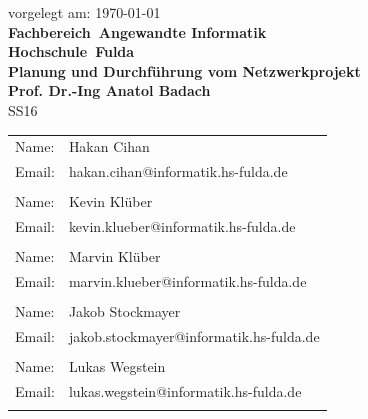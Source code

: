 \documentclass[a4paper,11pt]{article}
\begin{document}
\begin{titlepage}
\begin{center}
    \normalsize
    vorgelegt am: \today \\
    \vspace{0.5cm}
    \large \textbf{Fachbereich~Angewandte Informatik \\Hochschule~Fulda}\\
    \vspace{0.5cm}
    \huge \textbf{Planung und Durchführung vom Netzwerkprojekt}\\
    \vspace{0.5cm}
    \large \textbf{Prof. Dr.-Ing Anatol Badach}\\
    \vspace{0.5cm}
    \large{SS16}
    \vspace{0.5cm}
    \end{center}
 \normalsize{
    \begin{tabular}{ll}
    	Name: & {Hakan Cihan} \\
    	Email: & {hakan.cihan@informatik.hs-fulda.de} \\
    	\\
    	Name: & {Kevin Klüber} \\
    	Email: & {kevin.klueber@informatik.hs-fulda.de} \\
    	\\
    	Name: & {Marvin Klüber} \\
    	Email: & {marvin.klueber@informatik.hs-fulda.de} \\
	\\
    	Name: & {Jakob Stockmayer} \\
    	Email: & {jakob.stockmayer@informatik.hs-fulda.de} \\
	\\
    	Name: & {Lukas Wegstein} \\
    	Email: & {lukas.wegstein@informatik.hs-fulda.de} \\
	 \\
    	
    \end{tabular}\\
    }
\end{titlepage}
\newpage
\tableofcontents
\newpage
\makeatletter
\renewcommand{\l@figure}{\@dottedtocline{1}{0cm}{1.2cm}}
\makeatother
\listoffigures
\newpage
\end{document}
